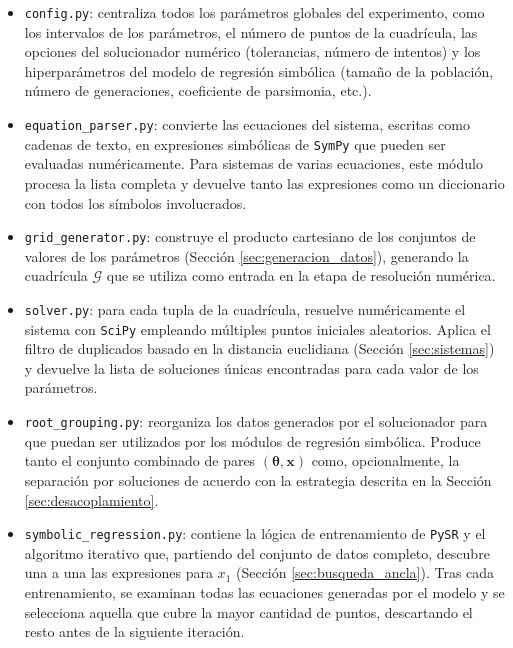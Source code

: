 \documentclass[12pt,a4paper]{article} \usepackage[utf8]{inputenc} \usepackage[spanish]{babel} \usepackage{amsmath, amssymb, amsthm} \usepackage{bm} \usepackage{float} \usepackage{longtable} \usepackage[hidelinks]{hyperref}
\newcommand{\xvec}{\mathbf{x}} \newcommand{\thetavec}{\boldsymbol{\theta}} \newcommand{\Fvec}{\mathbf{F}} \newcommand{\R}{\mathbb{R}} \newcommand{\norm}[1]{\left\lVert#1\right\rVert} \newcommand{\loss}{\mathcal{L}} \newcommand{\dataset}{\mathcal{D}} \newcommand{\jac}{\mathbf{J}}
\begin{document}
\begin{itemize}
    \item \texttt{config.py}: centraliza todos los parámetros globales del
    experimento, como los intervalos de los parámetros, el número de
    puntos de la cuadrícula, las opciones del solucionador numérico
    (tolerancias, número de intentos) y los hiperparámetros del modelo
    de regresión simbólica (tamaño de la población, número de
    generaciones, coeficiente de parsimonia, etc.).

    \item \texttt{equation\_parser.py}: convierte las ecuaciones del
    sistema, escritas como cadenas de texto, en expresiones simbólicas
    de \texttt{SymPy} \cite{sympy} que pueden ser evaluadas
    numéricamente. Para sistemas de varias ecuaciones, este módulo
    procesa la lista completa y devuelve tanto las expresiones como un
    diccionario con todos los símbolos involucrados.

    \item \texttt{grid\_generator.py}: construye el producto cartesiano
    de los conjuntos de valores de los parámetros (Sección
    \ref{sec:generacion_datos}), generando la cuadrícula \(\mathcal{G}\) que
    se utiliza como entrada en la etapa de resolución numérica.

    \item \texttt{solver.py}: para cada tupla de la cuadrícula, resuelve
    numéricamente el sistema con \texttt{SciPy} \cite{virtanen2020scipy}
    empleando múltiples puntos iniciales aleatorios. Aplica el filtro
    de duplicados basado en la distancia euclidiana (Sección
    \ref{sec:sistemas}) y devuelve la lista de soluciones únicas
    encontradas para cada valor de los parámetros.

    \item \texttt{root\_grouping.py}: reorganiza los datos generados por
    el solucionador para que puedan ser utilizados por los módulos de
    regresión simbólica. Produce tanto el conjunto combinado de pares
    \((\thetavec, \xvec)\) como, opcionalmente, la separación por
    soluciones de acuerdo con la estrategia descrita en la Sección
    \ref{sec:desacoplamiento}.

    \item \texttt{symbolic\_regression.py}: contiene la lógica de
    entrenamiento de \texttt{PySR} \cite{cranmer2023pysr} y el algoritmo
    iterativo que, partiendo del conjunto de datos completo, descubre
    una a una las expresiones para \(x_1\) (Sección
    \ref{sec:busqueda_ancla}). Tras cada entrenamiento, se examinan
    todas las ecuaciones generadas por el modelo y se selecciona
    aquella que cubre la mayor cantidad de puntos, descartando el
    resto antes de la siguiente iteración.


\end{itemize}
\end{document}
